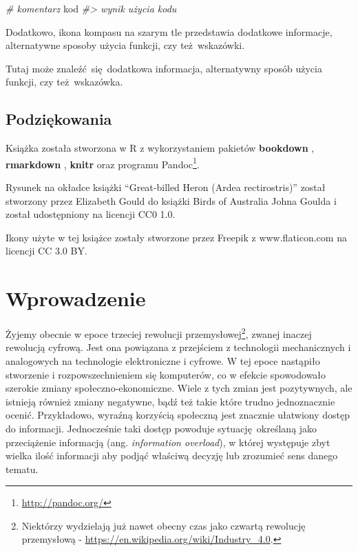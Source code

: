 \documentclass[paper=6in:9in,pagesize=pdftex,headinclude=on,footinclude=on,10pt]{scrbook}
\newenvironment{Shaded}{\begin{snugshade}}{\end{snugshade}}
\newcommand{\CommentTok}[1]{\textcolor[rgb]{0.56,0.35,0.01}{\textit{#1}}}
\newcommand{\NormalTok}[1]{#1}
\DeclareRobustCommand{\href}[2]{#2\footnote{\url{#1}}}
\let\BeginKnitrBlock\begin \let\EndKnitrBlock\end
\begin{document}
\begin{Shaded}
\begin{Highlighting}[]
\CommentTok{# komentarz}
\NormalTok{kod}
\CommentTok{#> wynik użycia kodu}
\end{Highlighting}
\end{Shaded}

Dodatkowo, ikona kompasu na szarym tle przedstawia dodatkowe informacje, alternatywne sposoby użycia funkcji, czy też~wskazówki.

\BeginKnitrBlock{rmdinfo}
Tutaj może znaleźć~się~dodatkowa informacja, alternatywny sposób użycia funkcji, czy też~wskazówka.
\EndKnitrBlock{rmdinfo}

\hypertarget{podziekowania}{%
\section*{Podziękowania}\label{podziekowania}}

Książka została stworzona w R \citep{R-base} z wykorzystaniem pakietów \textbf{bookdown} \citep{R-bookdown}, \textbf{rmarkdown} \citep{R-rmarkdown}, \textbf{knitr} \citep{R-knitr} oraz programu \href{http://pandoc.org/}{Pandoc}.

Rysunek na okładce książki ``Great-billed Heron (Ardea rectirostris)'' został stworzony przez Elizabeth Gould do książki Birds of Australia Johna Goulda i został udostępniony na licencji CC0 1.0.

Ikony użyte w tej książce zostały stworzone przez Freepik z www.flaticon.com na licencji CC 3.0 BY.

\hypertarget{wprowadzenie}{%
\chapter{Wprowadzenie}\label{wprowadzenie}}

Żyjemy obecnie w epoce trzeciej rewolucji przemysłowej\footnote{Niektórzy wydzielają już nawet obecny czas jako czwartą rewolucję przemysłową - \url{https://en.wikipedia.org/wiki/Industry_4.0}.}, zwanej inaczej rewolucją cyfrową.
Jest ona powiązana z przejściem z technologii mechanicznych i analogowych na technologie elektroniczne i cyfrowe.
W tej epoce nastąpiło stworzenie i rozpowszechnieniem się komputerów, co w efekcie spowodowało szerokie zmiany społeczno-ekonomiczne.
Wiele z tych zmian jest pozytywnych, ale istnieją również zmiany negatywne, bądź też takie które trudno jednoznacznie ocenić.
Przykładowo, wyraźną korzyścią społeczną jest znacznie ułatwiony dostęp do informacji.
Jednocześnie taki dostęp powoduje sytuację~określaną jako przeciążenie informacją (ang. \emph{information overload}), w której występuje zbyt wielka ilość informacji aby podjąć właściwą decyzję lub zrozumieć sens danego tematu.
\end{document}
